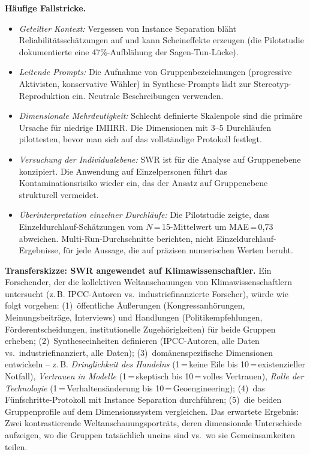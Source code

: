 \documentclass[11pt,a4paper]{article}
\begin{document}
\textbf{H\"aufige Fallstricke.}
\begin{itemize}[nosep]
  \item \emph{Geteilter Kontext:} Vergessen von Instance Separation bl\"aht Reliabilit\"atssch\"atzungen auf und kann Scheineffekte erzeugen (die Pilotstudie dokumentierte eine 47\%-Aufbl\"ahung der Sagen-Tun-L\"ucke).
  \item \emph{Leitende Prompts:} Die Aufnahme von Gruppenbezeichnungen (\glqq{}progressive Aktivisten\grqq{}, \glqq{}konservative W\"ahler\grqq{}) in Synthese-Prompts l\"adt zur Stereotyp-Reproduktion ein. Neutrale Beschreibungen verwenden.
  \item \emph{Dimensionale Mehrdeutigkeit:} Schlecht definierte Skalenpole sind die prim\"are Ursache f\"ur niedrige IMIIRR. Die Dimensionen mit 3--5 Durchl\"aufen pilottesten, bevor man sich auf das vollst\"andige Protokoll festlegt.
  \item \emph{Versuchung der Individualebene:} SWR ist f\"ur die Analyse auf Gruppenebene konzipiert. Die Anwendung auf Einzelpersonen f\"uhrt das Kontaminationsrisiko wieder ein, das der Ansatz auf Gruppenebene strukturell vermeidet.
  \item \emph{\"Uberinterpretation einzelner Durchl\"aufe:} Die Pilotstudie zeigte, dass Einzeldurchlauf-Sch\"atzungen vom $N$\,=\,15-Mittelwert um MAE\,=\,0,73 abweichen. Multi-Run-Durchschnitte berichten, nicht Einzeldurchlauf-Ergebnisse, f\"ur jede Aussage, die auf pr\"azisen numerischen Werten beruht.
\end{itemize}

\textbf{Transferskizze: SWR angewendet auf Klimawissenschaftler.} Ein Forschender, der die kollektiven Weltanschauungen von Klimawissenschaftlern untersucht (z.\,B. IPCC-Autoren vs.\ industriefinanzierte Forscher), w\"urde wie folgt vorgehen: (1)~\"offentliche \"Au\ss{}erungen (Kongressanh\"orungen, Meinungsbeitr\"age, Interviews) und Handlungen (Politikempfehlungen, F\"orderentscheidungen, institutionelle Zugeh\"origkeiten) f\"ur beide Gruppen erheben; (2)~Syntheseeinheiten definieren (\glqq{}IPCC-Autoren, alle Daten\grqq{} vs.\ \glqq{}industriefinanziert, alle Daten\grqq{}); (3)~dom\"anenspezifische Dimensionen entwickeln -- z.\,B. \emph{Dringlichkeit des Handelns} (1\,=\,keine Eile bis 10\,=\,existenzieller Notfall), \emph{Vertrauen in Modelle} (1\,=\,skeptisch bis 10\,=\,volles Vertrauen), \emph{Rolle der Technologie} (1\,=\,Verhaltens\"anderung bis 10\,=\,Geoengineering); (4)~das F\"unfschritte-Protokoll mit Instance Separation durchf\"uhren; (5)~die beiden Gruppenprofile auf dem Dimensionssystem vergleichen. Das erwartete Ergebnis: Zwei kontrastierende Weltanschauungsportr\"ats, deren dimensionale Unterschiede aufzeigen, wo die Gruppen tats\"achlich uneins sind vs.\ wo sie Gemeinsamkeiten teilen.
\end{document}
